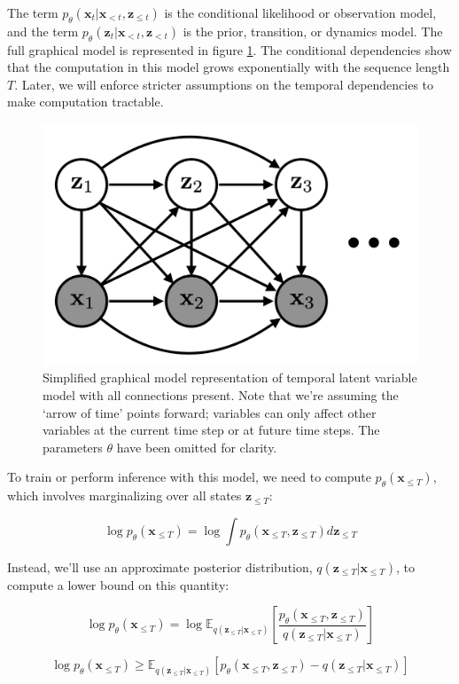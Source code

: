 \noindent The term $p_\theta (\mathbf{x}_{t} | \mathbf{x}_{< t}, \mathbf{z}_{\leq t})$ is the conditional likelihood or observation model, and the term $p_\theta (\mathbf{z}_{t} | \mathbf{x}_{< t}, \mathbf{z}_{< t})$ is the prior, transition, or dynamics model. The full graphical model is represented in figure \ref{fig: full_temporal_model}. The conditional dependencies show that the computation in this model grows exponentially with the sequence length $T$. Later, we will enforce stricter assumptions on the temporal dependencies to make computation tractable.

\begin{figure}[h]
    \centering
    \includegraphics[width=.5\textwidth]{images/graphical_models/full_temporal_model.png}
    \caption{Simplified graphical model representation of temporal latent variable model with all connections present. Note that we're assuming the `arrow of time' points forward; variables can only affect other variables at the current time step or at future time steps. The parameters $\theta$ have been omitted for clarity.}
    \label{fig: full_temporal_model}
\end{figure}

To train or perform inference with this model, we need to compute $p_\theta (\mathbf{x}_{\leq T})$, which involves marginalizing over all states $\mathbf{z}_{\leq T}$:

\begin{equation}
	\log p_\theta (\mathbf{x}_{\leq T}) = \log \int p_\theta (\mathbf{x}_{\leq T}, \mathbf{z}_{\leq T}) d \mathbf{z}_{\leq T}
\end{equation}

\noindent Instead, we'll use an approximate posterior distribution, $q (\mathbf{z}_{\leq T} | \mathbf{x}_{\leq T})$, to compute a lower bound on this quantity:

\begin{equation}
	\log p_\theta (\mathbf{x}_{\leq T}) = \log \mathbb{E}_{q (\mathbf{z}_{\leq T} | \mathbf{x}_{\leq T})} \left[ \frac{p_\theta (\mathbf{x}_{\leq T}, \mathbf{z}_{\leq T})}{q (\mathbf{z}_{\leq T} | \mathbf{x}_{\leq T})} \right]
\end{equation}

\begin{equation}
	\log p_\theta (\mathbf{x}_{\leq T}) \geq \mathbb{E}_{q (\mathbf{z}_{\leq T} | \mathbf{x}_{\leq T})} \left[ p_\theta (\mathbf{x}_{\leq T}, \mathbf{z}_{\leq T}) - q (\mathbf{z}_{\leq T} | \mathbf{x}_{\leq T}) \right]
\end{equation}
